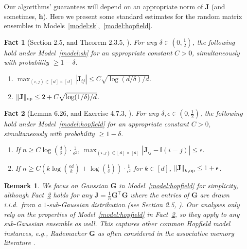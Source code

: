 \documentclass[11pt]{article}
\newtheorem{fact}{Fact}
\newtheorem{remark}{Remark}
\newcommand{\normsop}[1]{\lVert#1\rVert_{\textup{op}}}
\newcommand{\eps}{\epsilon}
\newcommand{\half}{\frac{1}{2}}
\newcommand{\1}{\mathbf{1}}
\newcommand{\0}{\mathbf{0}}
\newcommand{\ind}{\mathbb{I}}
\newcommand{\mg}{{\mathbf{G}}}
\newcommand{\mj}{{\mathbf{J}}}
\newcommand{\normkop}[2]{{\left\lVert#1\right\rVert_{#2, \textup{op}}}}
\newcommand{\vh}{{\mathbf{h}}}
\begin{document}
Our algorithms' guarantees will depend on an appropriate norm of $\mj$ (and sometimes, $\vh$). Here we present some standard estimates for the random matrix ensembles in Models~\ref{model:sk},~\ref{model:hopfield}.

\begin{fact}[Section 2.5, \cite{Vershynin18} and Theorem 2.3.5, \cite{AndersonGZ10}]\label{fact:sk_facts}
For any $\delta \in (0, \half)$, the following hold under Model~\ref{model:sk} for an appropriate constant $C > 0$, simultaneously with probability $\ge 1 - \delta$.
\begin{enumerate}
    \item $\max_{(i,j) \in [d] \times [d]} |\mj_{ij}| \le C \sqrt{\log(d/\delta)/d}$. \label{item:sk_entrywise}
    \item $\normsop{\mj} \le 2 + C \sqrt{\log(1/\delta)/d}$. \label{item:sk_opnorm}
\end{enumerate}
\end{fact}

\begin{fact}[Lemma 6.26, \cite{Wainwright19} and Exercise 4.7.3, \cite{Vershynin18}]\label{fact:ghop_facts}
For any $\delta, \eps \in (0, \half)$, the following hold under Model~\ref{model:hopfield} for an appropriate constant $C > 0$, simultaneously with probability $\ge 1 - \delta$.
\begin{enumerate}
    \item If $n \ge C\log(\frac d \delta) \cdot \frac 1 {\eps^2}$, $\max_{(i, j) \in [d] \times [d]} |\mj_{ij} - \ind(i = j)| \le \eps$.
    \item If $n \ge C (k\log(\frac {ed} k) + \log (\frac 1 \delta)) \cdot \frac 1 {\eps^2}$ for $k \in [d]$, $\normkop{\mj}{k} \le 1 + \eps$.
\end{enumerate}
\end{fact}

\begin{remark}\label{rem:subg}
We focus on Gaussian $\mg$ in Model~\ref{model:hopfield} for simplicity, although Fact~\ref{fact:ghop_facts} holds for any $\mj = \frac 1 n \mg^\top \mg$ where the entries of $\mg$ are drawn i.i.d.\ from a $1$-sub-Gaussian distribution (see Section 2.5, \cite{Vershynin18}). Our analyses only rely on the properties of Model~\ref{model:hopfield} in Fact~\ref{fact:ghop_facts}, so they apply to any sub-Gaussian ensemble as well. This captures other common Hopfield model instances, e.g., Rademacher $\mg$ as often considered in the associative memory literature \cite{Little74, PasturF77, Hopfield82}.
\end{remark}
\end{document}
